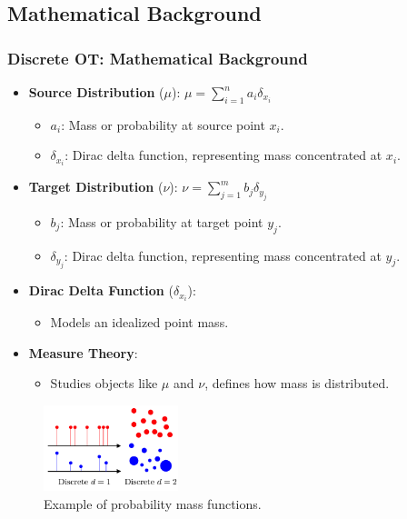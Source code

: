\documentclass{beamer}
\begin{document}
	\subsection{Mathematical Background}
	\begin{frame}
		\frametitle{Discrete OT: Mathematical Background}
		\begin{itemize}
			\item \textbf{Source Distribution} (\(\mu\)): \(\mu = \sum_{i=1}^n a_i \delta_{x_i}\)
			\begin{itemize}
				\item \(a_i\): Mass or probability at source point \(x_i\).
				\item \(\delta_{x_i}\): Dirac delta function, representing mass concentrated at \(x_i\).
			\end{itemize}
			
			\item \textbf{Target Distribution} (\(\nu\)): \(\nu = \sum_{j=1}^m b_j \delta_{y_j}\)
			\begin{itemize}
				\item \(b_j\): Mass or probability at target point \(y_j\).
				\item \(\delta_{y_j}\): Dirac delta function, representing mass concentrated at \(y_j\).
			\end{itemize}
			\item \textbf{Dirac Delta Function} (\(\delta_{x_i}\)):
			\begin{itemize}
				\item Models an idealized point mass.
			\end{itemize}
			
			\item \textbf{Measure Theory}:
			\begin{itemize}
				\item Studies objects like \(\mu\) and \(\nu\), defines how mass is distributed.
			\end{itemize}
		\end{itemize}
		\begin{figure}
			\includegraphics[width=0.35\textwidth]{discrete.png}
			\caption{Example of probability mass functions. \cite{peyre2019computational}}
		\end{figure}
	\end{frame}
	
\end{document}
